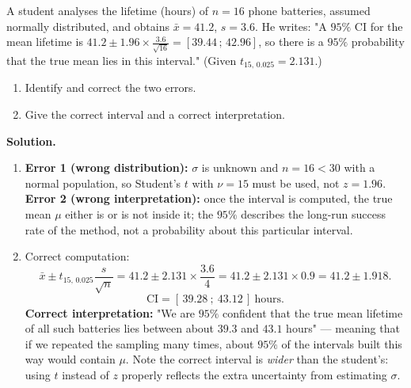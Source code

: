 \documentclass[11pt]{article}
\begin{document}
\begin{exoresolu}
A student analyses the lifetime (hours) of $n=16$ phone batteries, assumed normally distributed, and obtains $\bar{x}=41.2$, $s=3.6$. He writes: "A $95\%$ CI for the mean lifetime is $41.2\pm1.96\times\frac{3.6}{\sqrt{16}}=[39.44\,;\,42.96]$, so there is a $95\%$ probability that the true mean lies in this interval." (Given $t_{15,\,0.025}=2.131$.)
\begin{enumerate}
\item Identify and correct the two errors.
\item Give the correct interval and a correct interpretation.
\end{enumerate}
\tcblower
\textbf{Solution.}
\begin{enumerate}
\item \textbf{Error 1 (wrong distribution):} $\sigma$ is unknown and $n=16<30$ with a normal population, so Student's $t$ with $\nu=15$ must be used, not $z=1.96$. \textbf{Error 2 (wrong interpretation):} once the interval is computed, the true mean $\mu$ either is or is not inside it; the $95\%$ describes the long-run success rate of the method, not a probability about this particular interval.
\item Correct computation:
\[
\bar{x}\pm t_{15,\,0.025}\frac{s}{\sqrt{n}}
=41.2\pm2.131\times\frac{3.6}{4}
=41.2\pm2.131\times0.9
=41.2\pm1.918.
\]
\[
\text{CI}=[\,39.28\ ;\ 43.12\,]\ \text{hours}.
\]
\textbf{Correct interpretation:} "We are $95\%$ confident that the true mean lifetime of all such batteries lies between about $39.3$ and $43.1$ hours" — meaning that if we repeated the sampling many times, about $95\%$ of the intervals built this way would contain $\mu$. Note the correct interval is \emph{wider} than the student's: using $t$ instead of $z$ properly reflects the extra uncertainty from estimating $\sigma$.
\end{enumerate}
\end{exoresolu}
\end{document}
